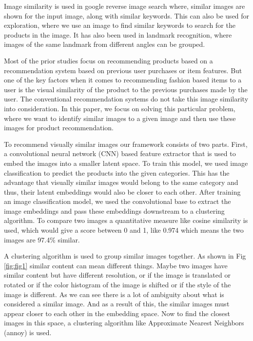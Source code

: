 \documentclass[12pt,twocolumn,letterpaper,Times New Roman]{article}
\begin{document}
Image similarity is used in google reverse image search where, similar images are shown for the input image, along with similar keywords. This can also be used for exploration, where we use an image to find similar keywords to search for the products in the image. It has also been used in landmark recognition, where images of the same landmark from different angles can be grouped.

Most of the prior studies focus on recommending products based on a recommendation system based on previous user purchases or item features. But one of the key factors when it comes to recommending fashion based items to a user is the visual similarity of the product to the previous purchases made by the user. The conventional recommendation systems do not take this image similarity into consideration. In this paper, we focus on solving this particular problem, where we want to identify similar images to a given image and then use these images for product recommendation.

To recommend visually similar images our framework consists of two parts. First, a convolutional neural network (CNN) based feature extractor that is used to embed the images into a smaller latent space. To train this model, we used image classification to predict the products into the given categories. This has the advantage that visually similar images would belong to the same category and thus, their latent embeddings would also be closer to each other. After training an image classification model, we used the convolutional base to extract the image embeddings and pass these embeddings downstream to a clustering algorithm. To compare two images a quantitative measure like cosine similarity is used, which would give a score between 0 and 1, like 0.974 which means the two images are 97.4\% similar.

A clustering algorithm is used to group similar images together. As shown in Fig \ref{fig:fig1} similar content can mean different things. Maybe two images have similar content but have different resolution, or if the image is translated or rotated or if the color histogram of the image is shifted or if the style of the image is different. As we can see there is a lot of ambiguity about what is considered a similar image. And as a result of this, the similar images must appear closer to each other in the embedding space. Now to find the closest images in this space, a clustering algorithm like Approximate Nearest Neighbors (annoy) is used.
\end{document}
